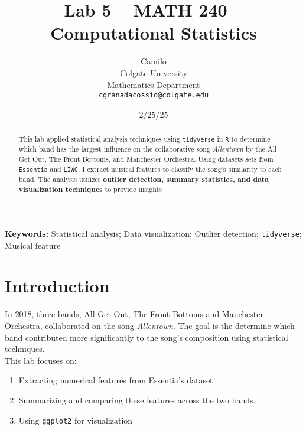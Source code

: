 \documentclass{article}\usepackage[]{graphicx}\usepackage[]{xcolor}
\begin{document}
\vspace{-1in}
\title{Lab 5 -- MATH 240 -- Computational Statistics}

\author{
  Camilo \\
  Colgate University  \\
  Mathematics Department  \\
  {\tt cgranadacossio@colgate.edu}
}

\date{2/25/25}

\maketitle

\begin{multicols}{2}
\begin{abstract}
This lab applied statistical analysis techniques using \texttt{tidyverse} in \texttt{R} to determine which band has the largest influence on the collaborative song \textit{Allentown} by the All Get Out, The Front Bottoms, and Manchester Orchestra. Using datasets sets from \texttt{Essentia} and \texttt{LIWC}, I extract musical features to classify the song's similarity to each band. The analysis utilizes \textbf{outlier detection, summary statistics, and data visualization techniques} to provide insights
\end{abstract}

\noindent \textbf{Keywords:} Statistical analysis; Data visualization; Outlier detection; \texttt{tidyverse}; Musical feature

\section{Introduction}

In 2018, three bands, All Get Out, The Front Bottoms and Manchester Orchestra, collaborated on the song \textit{Allentown}. The goal is the determine which band contributed more significantly to the song's composition using statistical techniques.\\

\noindent This lab focuses on:
\begin{enumerate}
\item Extracting numerical features from Essentia's dataset.
\item Summarizing and comparing these features across the two bands.
\item Using \texttt{ggplot2} for visualization
\end{enumerate}


\end{multicols}
\end{document}
